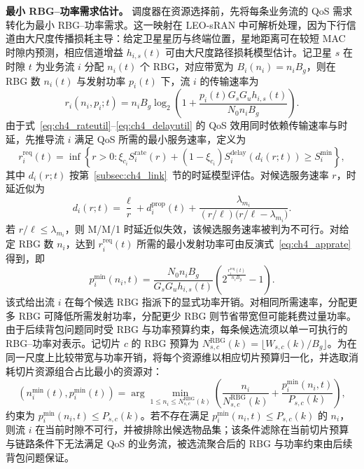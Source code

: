 \textbf{最小 RBG--功率需求估计。} 调度器在资源选择前，先将每条业务流的 QoS 需求转化为最小 RBG--功率需求。这一映射在 LEO-sRAN 中可解析处理，因为下行信道由大尺度传播损耗主导：给定卫星星历与终端位置，星地距离可在较短 MAC 时隙内预测，相应信道增益 $h_{i,s}(t)$ 可由大尺度路径损耗模型估计。记卫星 $s$ 在时隙 $t$ 为业务流 $i$ 分配 $n_i(t)$ 个 RBG，对应带宽为 $B_i(n_i)=n_iB_g$，则在 RBG 数 $n_i(t)$ 与发射功率 $p_i(t)$ 下，流 $i$ 的传输速率为
\begin{equation}\label{eq:ch4_apprate}
r_i(n_i,p_i;t)=n_iB_g\log_2\!\left(1+\frac{p_i(t)G_sG_uh_{i,s}(t)}{N_0n_iB_g}\right).
\end{equation}
由于式~\eqref{eq:ch4_rateutil}--\eqref{eq:ch4_delayutil} 的 QoS 效用同时依赖传输速率与时延，先推导流 $i$ 满足 QoS 所需的最小服务速率，定义为
\begin{equation}\label{eq:ch4_reqrate}
r_i^{\mathrm{req}}(t)=\inf\left\{r>0:\xi_{c_i}S_i^{\mathrm{rate}}(r)+(1-\xi_{c_i})S_i^{\mathrm{delay}}\!\left(d_i(r;t)\right)\ge S_i^{\min}\right\},
\end{equation}
其中 $d_i(r;t)$ 按第~\ref{subsec:ch4_link}~节的时延模型评估。对候选服务速率 $r$，时延近似为
\begin{equation}\label{eq:ch4_delaygivenrate}
d_i(r;t)=\frac{\ell}{r}+d_i^{\mathrm{prop}}(t)+\frac{\lambda_{m_i}}{(r/\ell)\big(r/\ell-\lambda_{m_i}\big)}.
\end{equation}
若 $r/\ell\le\lambda_{m_i}$，则 M/M/1 时延近似失效，该候选服务速率被判为不可行。对给定 RBG 数 $n_i$，达到 $r_i^{\mathrm{req}}(t)$ 所需的最小发射功率可由反演式~\eqref{eq:ch4_apprate} 得到，即
\begin{equation}\label{eq:ch4_minpower}
p_i^{\min}(n_i,t)=\frac{N_0n_iB_g}{G_sG_uh_{i,s}(t)}\left(2^{\frac{r_i^{\mathrm{req}}(t)}{n_iB_g}}-1\right).
\end{equation}
该式给出流 $i$ 在每个候选 RBG 指派下的显式功率开销。对相同所需速率，分配更多 RBG 可降低所需发射功率，分配更少 RBG 则节省带宽但可能耗费过量功率。由于后续背包问题同时受 RBG 与功率预算约束，每条候选流须以单一可执行的 RBG--功率对表示。记切片 $c$ 的 RBG 预算为 $N_{s,c}^{\mathrm{RBG}}(k)=\lfloor W_{s,c}(k)/B_g\rfloor$。为在同一尺度上比较带宽与功率开销，将每个资源维以相应切片预算归一化，并选取消耗切片资源组合占比最小的资源对：
\begin{equation}\label{eq:ch4_minpair}
(n_i^{\min}(t),p_i^{\min}(t))=\arg\min_{1\le n_i\le N_{s,c}^{\mathrm{RBG}}(k)}\left(\frac{n_i}{N_{s,c}^{\mathrm{RBG}}(k)}+\frac{p_i^{\min}(n_i,t)}{P_{s,c}(k)}\right),
\end{equation}
约束为 $p_i^{\min}(n_i,t)\le P_{s,c}(k)$。若不存在满足 $p_i^{\min}(n_i,t)\le P_{s,c}(k)$ 的 $n_i$，则流 $i$ 在当前时隙不可行，并被排除出候选物品集；该条件滤除在当前切片预算与链路条件下无法满足 QoS 的业务流，被选流聚合后的 RBG 与功率约束由后续背包问题保证。

